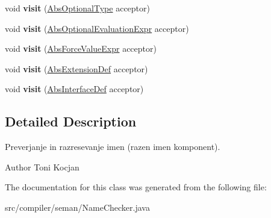 \begin{DoxyCompactItemize}
\mbox{\label{classcompiler_1_1seman_1_1_name_checker_a294cb17e13e562e4a03691b775d754cb}} 
void {\bfseries visit} (\hyperlink{classcompiler_1_1abstr_1_1tree_1_1type_1_1_abs_optional_type}{Abs\+Optional\+Type} acceptor)
\item 
\mbox{\label{classcompiler_1_1seman_1_1_name_checker_a21b9fc130d28b3b97ddd458999958c22}} 
void {\bfseries visit} (\hyperlink{classcompiler_1_1abstr_1_1tree_1_1expr_1_1_abs_optional_evaluation_expr}{Abs\+Optional\+Evaluation\+Expr} acceptor)
\item 
\mbox{\label{classcompiler_1_1seman_1_1_name_checker_aae19b79f8927e6b2ddf908502d1bbc2f}} 
void {\bfseries visit} (\hyperlink{classcompiler_1_1abstr_1_1tree_1_1expr_1_1_abs_force_value_expr}{Abs\+Force\+Value\+Expr} acceptor)
\item 
\mbox{\label{classcompiler_1_1seman_1_1_name_checker_afa303afb5c6c40b7d15006cf78f91ea1}} 
void {\bfseries visit} (\hyperlink{classcompiler_1_1abstr_1_1tree_1_1def_1_1_abs_extension_def}{Abs\+Extension\+Def} acceptor)
\item 
\mbox{\label{classcompiler_1_1seman_1_1_name_checker_a1847c536274159e8e24fa5fc975b421b}} 
void {\bfseries visit} (\hyperlink{classcompiler_1_1abstr_1_1tree_1_1def_1_1_abs_interface_def}{Abs\+Interface\+Def} acceptor)
\end{DoxyCompactItemize}


\subsection{Detailed Description}
Preverjanje in razresevanje imen (razen imen komponent).

\begin{DoxyAuthor}{Author}
Toni Kocjan 
\end{DoxyAuthor}


The documentation for this class was generated from the following file\+:\begin{DoxyCompactItemize}
\item 
src/compiler/seman/Name\+Checker.\+java\end{DoxyCompactItemize}
